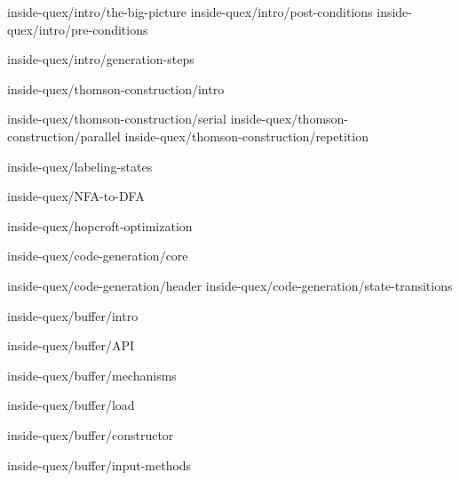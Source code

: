 \documentclass{scrbook}
\def\quex{{que{\raise 0.2em \hbox{$\chi$}}}}
\def\Quex{{Que{\raise 0.2em \hbox{$\chi$}}}}
\begin{document}
               {inside-quex/intro/the-big-picture}
                  {inside-quex/intro/post-conditions}
                  {inside-quex/intro/pre-conditions}

               {inside-quex/intro/generation-steps}

	    {inside-quex/thomson-construction/intro}
	  
  	          {inside-quex/thomson-construction/serial}
	          {inside-quex/thomson-construction/parallel}
	          {inside-quex/thomson-construction/repetition}

            {inside-quex/labeling-states}  

            {inside-quex/NFA-to-DFA}

	    {inside-quex/hopcroft-optimization}

            {inside-quex/code-generation/core}
	  
                  {inside-quex/code-generation/header}    
                  {inside-quex/code-generation/state-transitions}    

          {inside-quex/buffer/intro}

	      {inside-quex/buffer/API}

	      {inside-quex/buffer/mechanisms}
	      
	      {inside-quex/buffer/load}
	      
	      {inside-quex/buffer/constructor}

              {inside-quex/buffer/input-methods}



\end{document}
